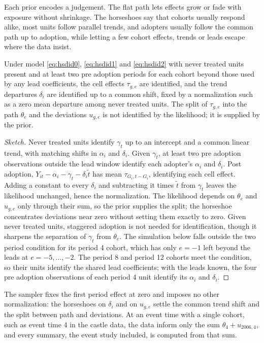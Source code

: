 Each prior encodes a judgement. The flat path lets effects grow or fade with exposure without shrinkage. The horseshoes say that cohorts usually respond alike, most units follow parallel trends, and adopters usually follow the common path up to adoption, while letting a few cohort effects, trends or leads escape where the data insist.

\begin{proposition}
Under model \eqref{eq:hsdid0}, \eqref{eq:hsdid1} and \eqref{eq:hsdid2} with never treated units present and at least two pre adoption periods for each cohort beyond those used by any lead coefficients, the cell effects $\tau_{g,e}$ are identified, and the trend departures $\delta_i$ are identified up to a common shift, fixed by a normalization such as a zero mean departure among never treated units. The split of $\tau_{g,e}$ into the path $\theta_e$ and the deviations $u_{g,e}$ is not identified by the likelihood; it is supplied by the prior.
\end{proposition}

\begin{proof}[Sketch]
Never treated units identify $\gamma_t$ up to an intercept and a common linear trend, with matching shifts in $\alpha_i$ and $\delta_i$. Given $\gamma_t$, at least two pre adoption observations outside the lead window identify each adopter's $\alpha_i$ and $\delta_i$. Post adoption, $Y_{it} - \alpha_i - \gamma_t - \delta_i\tilde t$ has mean $\tau_{G_i, t - G_i}$, identifying each cell effect. Adding a constant to every $\delta_i$ and subtracting it times $\tilde t$ from $\gamma_t$ leaves the likelihood unchanged, hence the normalization. The likelihood depends on $\theta_e$ and $u_{g,e}$ only through their sum, so the prior supplies the split; the horseshoe concentrates deviations near zero without setting them exactly to zero. Given never treated units, staggered adoption is not needed for identification, though it sharpens the separation of $\gamma_t$ from $\theta_e$. The simulation below falls outside the two period condition for its period 4 cohort, which has only $e = -1$ left beyond the leads at $e = -5, \ldots, -2$. The period 8 and period 12 cohorts meet the condition, so their units identify the shared lead coefficients; with the leads known, the four pre adoption observations of each period 4 unit identify its $\alpha_i$ and $\delta_i$.
\end{proof}

The sampler fixes the first period effect at zero and imposes no other normalization: the horseshoes on $\delta_i$ and on $u_{g,e}$ settle the common trend shift and the split between path and deviations. At an event time with a single cohort, such as event time 4 in the castle data, the data inform only the sum $\theta_4 + u_{2006,4}$, and every summary, the event study included, is computed from that sum.

